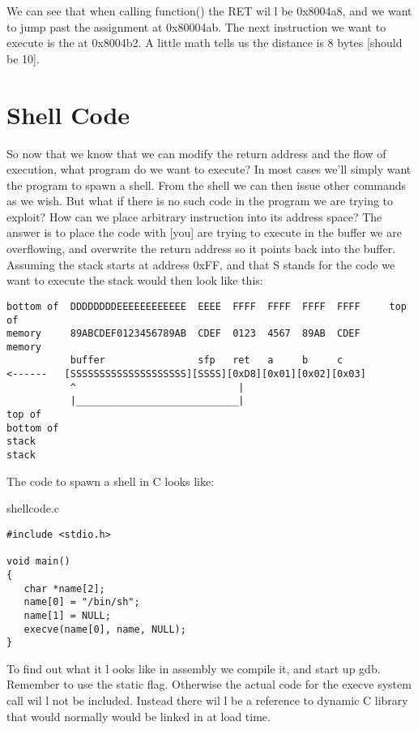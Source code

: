 \documentclass[10pt]{article}
\begin{document}
We can see that when calling function() the RET wil l be 0x8004a8, and we want to jump past the assignment at 
0x80004ab. The next instruction we want to execute is the at 0x8004b2. A little math tells us the distance is 8 
bytes [should be 10]. 

\section{Shell Code}

So now that we know that we can modify the return address and the flow of execution, what program do we 
want to execute? In most cases we'll simply want the program to spawn a shell. From the shell we can then issue 
other commands as we wish. But what  if there is no such code in the program we are trying to exploit? How can 
we place arbitrary instruction into its address space? The answer is to place the code with [you] are trying to 
execute in the buffer we are overflowing, and overwrite the return address so it points back into the buffer. 
Assuming the stack starts at address 0xFF, and that S stands for the code we want to execute the stack would 
then look like this:

\begin{verbatim}
bottom of  DDDDDDDDEEEEEEEEEEEE  EEEE  FFFF  FFFF  FFFF  FFFF     top of
memory     89ABCDEF0123456789AB  CDEF  0123  4567  89AB  CDEF     memory           
           buffer                sfp   ret   a     b     c
<------   [SSSSSSSSSSSSSSSSSSSS][SSSS][0xD8][0x01][0x02][0x03]
           ^                            |
           |____________________________|
top of                                                            bottom of
stack                                                                 stack
\end{verbatim}

  

The code to spawn a shell in C looks like:

shellcode.c

\begin{lstlisting}
#include <stdio.h>

void main() 
{
   char *name[2];
   name[0] = "/bin/sh";
   name[1] = NULL;
   execve(name[0], name, NULL);
}
\end{lstlisting}

To find out what it l ooks like in assembly we compile it, and start up gdb. Remember to use the  static flag. 
Otherwise the actual code  for the execve system call wil l not be included. Instead there wil l be a reference to 
dynamic C library that would normally would be linked in at load time. 
\end{document}

